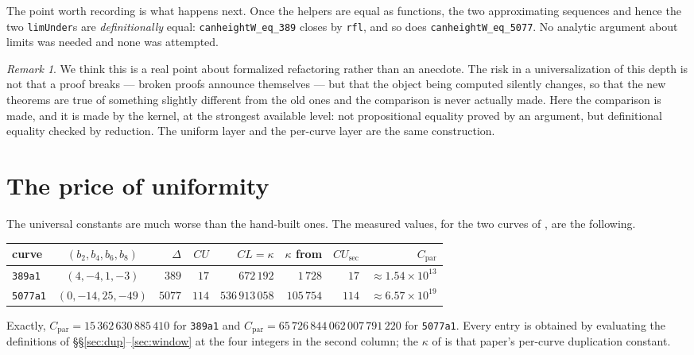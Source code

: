 \documentclass[11pt,reqno]{amsart}
\theoremstyle{plain}
\theoremstyle{definition}
\theoremstyle{remark}
\newtheorem{remark}[theorem]{Remark}
\DeclareRobustCommand{\lt}[1]{\texttt{#1}}
\begin{document}
The point worth recording is what happens next. Once the helpers are
equal as functions, the two approximating sequences and hence the two
\lt{limUnder}s are \emph{definitionally} equal:
\lt{canheightW\_eq\_389} closes by \lt{rfl}, and so does
\lt{canheightW\_eq\_5077}. No analytic argument about limits was needed
and none was attempted.

\begin{remark}\label{rem:collapse}
We think this is a real point about formalized refactoring rather than
an anecdote. The risk in a universalization of this depth is not that a
proof breaks --- broken proofs announce themselves --- but that the
object being computed silently changes, so that the new theorems are
true of something slightly different from the old ones and the
comparison is never actually made. Here the comparison is made, and it
is made by the kernel, at the strongest available level: not
propositional equality proved by an argument, but definitional equality
checked by reduction. The uniform layer and the per-curve layer are the
same construction.
\end{remark}

\section{The price of uniformity}\label{sec:price}

The universal constants are much worse than the hand-built ones. The
measured values, for the two curves of \cite{MW}, are the following.

\begin{center}
\small
\begin{tabular}{lcrrrrrr}
\toprule
curve & $(b_2,b_4,b_6,b_8)$ & $\Delta$ & $CU$ & $CL = \kappa$
  & $\kappa$ from \cite{MW} & $CU_{\mathrm{sec}}$
  & $C_{\mathrm{par}}$ \\
\midrule
\texttt{389a1}  & $(4,-4,1,-3)$    & $389$  & $17$  & $672\,192$
  & $1\,728$   & $17$  & ${\approx}1.54\times10^{13}$\\
\texttt{5077a1} & $(0,-14,25,-49)$ & $5077$ & $114$ & $536\,913\,058$
  & $105\,754$ & $114$ & ${\approx}6.57\times10^{19}$\\
\bottomrule
\end{tabular}
\end{center}

\noindent
Exactly, $C_{\mathrm{par}} = 15\,362\,630\,885\,410$ for
\texttt{389a1} and
$C_{\mathrm{par}} = 65\,726\,844\,062\,007\,791\,220$ for
\texttt{5077a1}. Every entry is obtained by evaluating the definitions
of \S\S\ref{sec:dup}--\ref{sec:window} at the four integers in the
second column; the $\kappa$ of \cite{MW} is that paper's per-curve
duplication constant.
\end{document}
